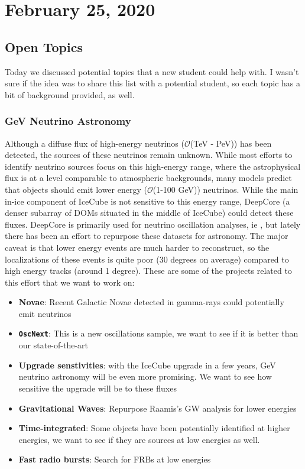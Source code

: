 \chapter{February 25, 2020}

\section{Open Topics}
\label{topics}
Today we discussed potential topics that a new student could help with. I wasn't sure if the idea was to share this list with a potential student, so each topic has a bit of background provided, as well.

\subsection*{\textbf{GeV Neutrino Astronomy}}
Although a diffuse flux of high-energy neutrinos ($\mathcal{O}$(TeV - PeV)) has been detected, the sources of these neutrinos remain unknown. While most efforts to identify neutrino sources focus on this high-energy range, where the astrophysical flux is at a level comparable to atmospheric backgrounds, many models predict that objects should emit lower energy ($\mathcal{O}$(1-100 GeV)) neutrinos. While the main in-ice component of IceCube is not sensitive to this energy range, DeepCore (a denser subarray of DOMs situated in the middle of IceCube) could detect these fluxes. DeepCore is primarily used for neutrino oscillation analyses, ie \cite{Aartsen:2017nmd, Aartsen:2019tjl}, but lately there has been an effort to repurpose these datasets for astronomy. The major caveat is that lower energy events are much harder to reconstruct, so the localizations of these events is quite poor (30 degrees on average) compared to high energy tracks (around 1 degree). These are some of the projects related to this effort that we want to work on:
\begin{itemize}
    \itemsep-1em
    \item \textbf{Novae}: Recent Galactic Novae detected in gamma-rays could potentially emit neutrinos \cite{Ackermann:2014vfa, Abdo:2010he, Franckowiak:2017iwj, Li:2017crr, Derdzinski:2016cuw, Metzger:2015zka}
    \item \textbf{\texttt{OscNext}}: This is a new oscillations sample, we want to see if it is better than our state-of-the-art
    \item \textbf{Upgrade senstivities}: with the IceCube upgrade in a few years, GeV neutrino astronomy will be even more promising. We want to see how sensitive the upgrade will be to these fluxes
    \item \textbf{Gravitational Waves}: Repurpose Raamis's GW analysis for lower energies
    \item \textbf{Time-integrated}: Some objects have been potentially identified at higher energies, we want to see if they are sources at low energies as well. 
    \item \textbf{Fast radio bursts}: Search for FRBs at low energies
\end{itemize}

